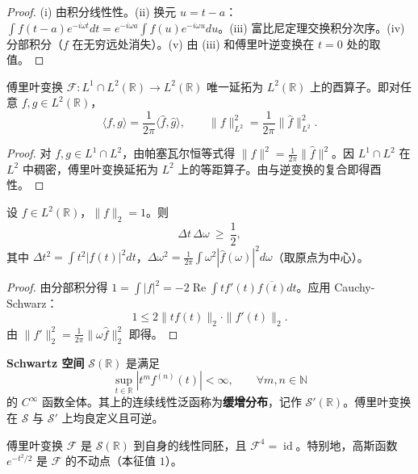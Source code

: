 \begin{proof}
(i) 由积分线性性。(ii) 换元 $u = t - a$：$\int f(t-a)e^{-i\omega t}dt = e^{-i\omega a}\int f(u)e^{-i\omega u}du$。(iii) 富比尼定理交换积分次序。(iv) 分部积分（$f$ 在无穷远处消失）。(v) 由 (iii) 和傅里叶逆变换在 $t=0$ 处的取值。
\end{proof}

\begin{theorem}[Plancherel 定理]\label{thm:plancherel}
傅里叶变换 $\mathcal{F}:L^1\cap L^2(\mathbb{R})\to L^2(\mathbb{R})$ 唯一延拓为 $L^2(\mathbb{R})$ 上的酉算子。即对任意 $f,g\in L^2(\mathbb{R})$，
\[
\langle f,g\rangle = \frac{1}{2\pi}\langle \hat{f},\hat{g}\rangle,\qquad
\|f\|_{L^2}^2 = \frac{1}{2\pi}\|\hat f\|_{L^2}^2.
\]
\end{theorem}

\begin{proof}
对 $f,g\in L^1\cap L^2$，由帕塞瓦尔恒等式得 $\|f\|^2=\frac{1}{2\pi}\|\hat f\|^2$。因 $L^1\cap L^2$ 在 $L^2$ 中稠密，傅里叶变换延拓为 $L^2$ 上的等距算子。由与逆变换的复合即得酉性。
\end{proof}

\begin{theorem}[不确定性原理]\label{thm:uncertainty}
设 $f\in L^2(\mathbb{R})$，$\|f\|_2=1$。则
\[
\Delta t\,\Delta\omega\ \ge\ \frac12,
\]
其中 $\Delta t^2=\int t^2|f(t)|^2dt$，$\Delta\omega^2=\frac{1}{2\pi}\int\omega^2|\hat f(\omega)|^2d\omega$（取原点为中心）。
\end{theorem}

\begin{proof}
由分部积分得 $1=\int|f|^2 = -2\operatorname{Re}\int t f'(t)\overline{f(t)}dt$。应用 Cauchy-Schwarz：
\[
1\le 2\|tf(t)\|_2\cdot\|f'(t)\|_2.
\]
由 $\|f'\|_2^2=\frac{1}{2\pi}\|\omega\hat f\|_2^2$ 即得。
\end{proof}

\begin{definition}\label{def:schwartz}
\textbf{Schwartz 空间} $\mathcal{S}(\mathbb{R})$ 是满足
\[
\sup_{t\in\mathbb{R}}|t^m f^{(n)}(t)|<\infty,\qquad \forall m,n\in\mathbb{N}
\]
的 $C^\infty$ 函数全体。其上的连续线性泛函称为\textbf{缓增分布}，记作 $\mathcal{S}'(\mathbb{R})$。傅里叶变换在 $\mathcal{S}$ 与 $\mathcal{S}'$ 上均良定义且可逆。
\end{definition}

\begin{property}\label{prop:schwartz_invariance}
傅里叶变换 $\mathcal{F}$ 是 $\mathcal{S}(\mathbb{R})$ 到自身的线性同胚，且 $\mathcal{F}^4=\operatorname{id}$。特别地，高斯函数 $e^{-t^2/2}$ 是 $\mathcal{F}$ 的不动点（本征值 $1$）。
\end{property}

